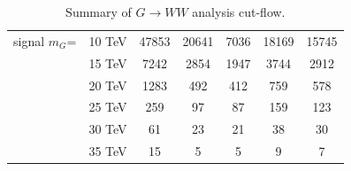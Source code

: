 \documentclass{cernrep}
\begin{document}
\begin{table}[!htb]
{\begin{tabular}{|c|c|c|c|c|c|c|}
\hline
signal $m_{G}$= & 10 TeV        & 47853     & 20641   & 7036   & 18169  & 15745 \\
                & 15 TeV        & 7242      & 2854    & 1947   & 3744   & 2912  \\
                & 20 TeV        & 1283      & 492     & 412    & 759    & 578   \\
                & 25 TeV        & 259       & 97      & 87     & 159    & 123   \\
                & 30 TeV        & 61        & 23      & 21     & 38     & 30    \\
                & 35 TeV        & 15        & 5       & 5      & 9      & 7     \\
\hline
\hline
\end{tabular}}
\caption{Summary of $G \rightarrow WW$ analysis cut-flow.}
\label{tab:RSGww_cutflow}
\end{table}

\clearpage
\newpage

%
%
%
\end{document}
